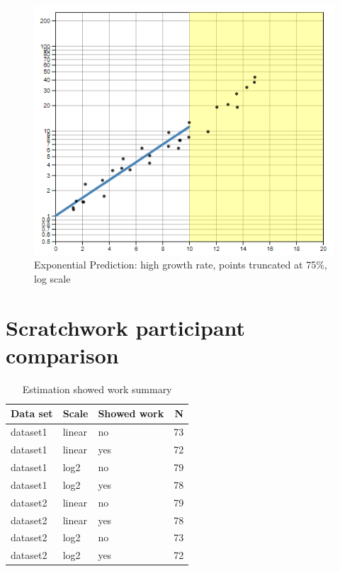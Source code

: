 \documentclass[print]{nuthesis}
\begin{document}
\begin{figure}[tbp]

{\centering \includegraphics[width=0.65\linewidth,]{images/02-you-draw-it/high-15-log} 

}

\caption{Exponential Prediction: high growth rate, points truncated at 75\%, log scale}\label{fig:high-15-log}
\end{figure}

\hypertarget{estimation-comparison}{%
\section{Scratchwork participant comparison}\label{estimation-comparison}}

\begin{table}

\caption{\label{tab:unnamed-chunk-2}Estimation showed work summary}
\centering
\begin{tabular}[t]{lllr}
\toprule
Data set & Scale & Showed work & N\\
\midrule
dataset1 & linear & no & 73\\
dataset1 & linear & yes & 72\\
dataset1 & log2 & no & 79\\
dataset1 & log2 & yes & 78\\
dataset2 & linear & no & 79\\
\addlinespace
dataset2 & linear & yes & 78\\
dataset2 & log2 & no & 73\\
dataset2 & log2 & yes & 72\\
\bottomrule
\end{tabular}
\end{table}
\end{document}
